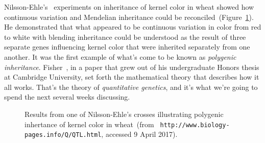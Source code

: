 \documentclass[12pt]{article}
\begin{document}
Nilsson-Ehle's~\cite{NilssonEhle-1909} experiments on inheritance of
kernel color in wheat showed how continuous variation and Mendelian
inheritance could be reconciled~(Figure~\ref{fig:nilsson-ehle}). He
demonstrated that what appeared to be continuous variation in color
from red to white with blending inheritance could be understood as the
result of three separate genes influencing kernel color that were
inherited separately from one another. It was the first example of
what's come to be known as {\it polygenic inheritance}. Fisher~\cite{Fisher-1918}, in a paper that grew out of
his undergraduate Honors thesis at Cambridge University, set forth the
mathematical theory that describes how it all works. That's the theory
of {\it quantitative genetics}, and it's what we're going to spend the
next several weeks discussing.

\begin{figure}
\begin{center}
\end{center}
\caption{Results from one of Nilsson-Ehle's crosses illustrating
  polygenic inhertance of kernel color in wheat~(from {\tt
    http://www.biology-pages.info/Q/QTL.html}, accessed 9 April 2017).}\label{fig:nilsson-ehle}
\end{figure}
\end{document}
